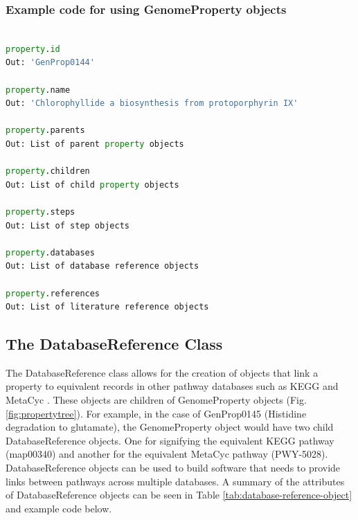 \subsubsection{Example code for using GenomeProperty objects}

\begin{lstlisting}[language=Python]

property.id
Out: 'GenProp0144'
	
property.name
Out: 'Chlorophyllide a biosynthesis from protoporphyrin IX'

property.parents
Out: List of parent property objects

property.children	
Out: List of child property objects

property.steps
Out: List of step objects		
	
property.databases
Out: List of database reference objects

property.references
Out: List of literature reference objects

\end{lstlisting}

\subsection{The DatabaseReference Class}

The DatabaseReference class allows for the creation of objects that link a property to equivalent records in other pathway databases such as KEGG \cite{kanehisa2000kegg} and MetaCyc \cite{karp2002metacyc}. These objects are children of GenomeProperty objects (Fig. \ref{fig:propertytree}). For example, in the case of GenProp0145 (Histidine degradation to glutamate), the GenomeProperty object would have two child DatabaseReference objects. One for signifying the equivalent KEGG pathway (map00340) and another for the equivalent MetaCyc pathway (PWY-5028). DatabaseReference objects can be used to build software that needs to provide links between pathways across multiple databases. A summary of the attributes of DatabaseReference objects can be seen in Table \ref{tab:database-reference-object} and example code below.


